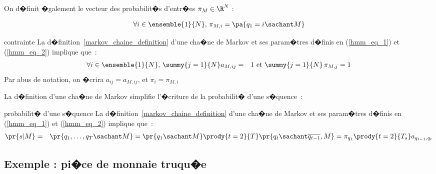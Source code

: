 On d�finit �galement le vecteur des probabilit�s d'entr�es $\pi_M \in \R^N$ :

        \begin{eqnarray}
        \forall i\in \ensemble{1}{N} ,\, \pi_{M,i}=\pa { q_{1}=i \sachant  M }
        \label{hmm_eq_2}
        \end{eqnarray}

            \begin{xproperty}{contrainte}
            \label{propriete_mmc_contrainte_1}%
            La d�finition~\ref{markov_chaine_definition} d'une cha�ne de Markov et ses param�tres d�finis en 
            (\ref{hmm_eq_1}) et (\ref{hmm_eq_2}) implique que~:
                    \begin{eqnarray*}
                    \forall i \in \ensemble{1}{N} , \,\summy{j=1}{N}a_{M,ij}&=&1 \text{ et } \summy{j=1}{N} \,\pi_{M,j} = 1
                    \end{eqnarray*}
            Par abus de notation, on �crira $a_{ij}=a_{M,ij}$, et $\pi_{i}=\pi_{M,i}$
            \end{xproperty}


La d�finition d'une cha�ne de Markov simplifie l'�criture de la probabilit� d'une s�quence~:

        \begin{xproperty}{probabilit� d'une s�quence}
        La d�finition~\ref{markov_chaine_definition} d'une cha�ne de Markov et ses param�tres d�finis en (\ref{hmm_eq_1}) et
             (\ref{hmm_eq_2}) implique que~:
                \begin{eqnarray*}
                \pr{s|M}        &=& \pr{q_1,\dots,q_T \sachant M} = \pr{q_1 \sachant M}\prody{t=2}{T}
                                                                 \pr{q_t \sachant \overline{q_{t-1}},M} 
                                = \pi_{q_1} \prody{t=2}{T_s} a_{q_{t-1},q_t}
                \end{eqnarray*}
        \end{xproperty}









\subsection{Exemple : pi�ce de monnaie truqu�e} \label{chaine_markov_exemple}

%

